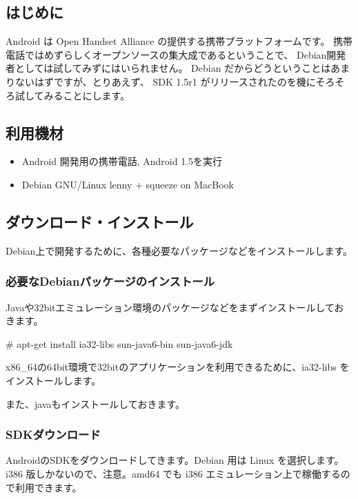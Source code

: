 \documentclass[mingoth,a4paper]{jsarticle}
\begin{document}
\begin{commandline}
\subsection{はじめに}

Android は Open Handset Alliance の提供する携帯プラットフォームです。
携帯電話ではめずらしくオープンソースの集大成であるということで、
Debian開発者としては試してみずにはいられません。
Debian だからどうということはあまりないはずですが、とりあえず、
SDK 1.5r1 がリリースされたのを機にそろそろ試してみることにします。

\subsection{利用機材}

\begin{itemize}
 \item Android 開発用の携帯電話, Android 1.5を実行
 \item Debian GNU/Linux lenny + squeeze on MacBook
\end{itemize}

\subsection{ダウンロード・インストール}

Debian上で開発するために、各種必要なパッケージなどをインストールします。

\subsubsection{必要なDebianパッケージのインストール}

Javaや32bitエミュレーション環境のパッケージなどをまずインストールしてお
きます。

\begin{commandline}
# apt-get install ia32-libs sun-java6-bin sun-java6-jdk 
\end{commandline}

x86\_64の64bit環境で32bitのアプリケーションを利用できるために、ia32-libs
をインストールします。

また、javaもインストールしておきます。

\subsubsection{SDKダウンロード}

AndroidのSDKをダウンロードしてきます。Debian 用は Linux を選択します。
i386 版しかないので、注意。amd64 でも i386 エミュレーション上で稼働するの
で利用できます。


\end{commandline}
\end{document}

